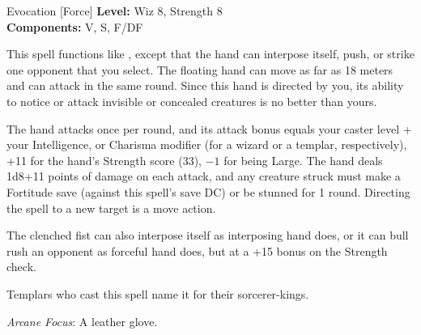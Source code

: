 {Evocation [Force]}
{
	\textbf{Level:}
	Wiz 8, Strength 8\\
	\textbf{Components:}
	V, S, F/DF\\
}
{
	This spell functions like , except that the hand can interpose itself, push, or strike one opponent that you select. The floating hand can move as far as 18 meters and can attack in the same round. Since this hand is directed by you, its ability to notice or attack invisible or concealed creatures is no better than yours.

	The hand attacks once per round, and its attack bonus equals your caster level + your Intelligence, or Charisma modifier (for a wizard or a templar, respectively), +11 for the hand's Strength score (33), $-1$ for being Large. The hand deals 1d8+11 points of damage on each attack, and any creature struck must make a Fortitude save (against this spell's save DC) or be stunned for 1 round. Directing the spell to a new target is a move action.

	The clenched fist can also interpose itself as interposing hand does, or it can bull rush an opponent as forceful hand does, but at a +15 bonus on the Strength check.

	Templars who cast this spell name it for their sorcerer-kings.

	\textit{Arcane Focus}:
	A leather glove.

}
